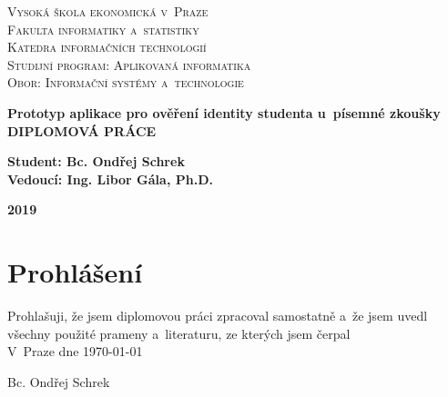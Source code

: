 \documentclass[12pt, a4paper]{report}
\newcommand{\ConstAuthorName}{Bc. Ondřej Schrek}
\newcommand{\ConstWriteDate}{\today}
\begin{document}
 
	\pagestyle{empty} %
	
	\begin{titlepage} %
		\centering
		\begin{center}
			\textsc{\LARGE Vysoká škola ekonomická v~Praze}\\[1.5cm]
			\textsc{\Large Fakulta informatiky a~statistiky}\\[0.5cm]
			\textsc{\large Katedra informačních technologií}\\[1.5cm]
			
			\textsc{Studijní program: Aplikovaná informatika}\\[0.5cm]
			\textsc{Obor: Informační systémy a~technologie}\\
			\vspace*{\fill}
			
			{\huge \bfseries{Prototyp aplikace pro ověření identity studenta u~písemné zkoušky }}\\[1.5cm]
			\textbf{DIPLOMOVÁ PRÁCE}
		\end{center}
	
		\vspace*{\fill}
		
		\begin{flushleft} %
			{\large
				\textbf{Student: \ConstAuthorName}\\
				\textbf{Vedoucí: Ing. Libor Gála, Ph.D.}
			}
		\end{flushleft}
	
		\vfill
		
		\begin{minipage}[b]{\textwidth}
			\begin{center}
				\large \textbf{2019}
			\end{center}
		\end{minipage}

	\end{titlepage} %
	
	\clearpage\mbox{}\clearpage %
	
	\vspace*{\fill}
	\section*{Prohlášení}
	\noindent Prohlašuji, že jsem diplomovou práci zpracoval samostatně
	a~že jsem uvedl všechny použité prameny a~literaturu, ze kterých jsem čerpal\\[1.5cm]
	\noindent V~Praze dne \ConstWriteDate \hfill \dotfill\\
	\begin{minipage}{\textwidth}
		\hfill \ConstAuthorName \hspace*{1cm}
	\end{minipage}
	
\end{document}
